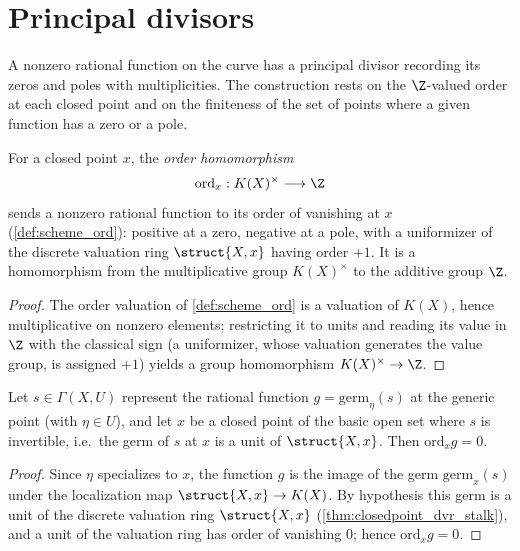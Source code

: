 \section{Principal divisors}

A nonzero rational function on the curve has a principal divisor recording its zeros and poles with
multiplicities. The construction rests on the \(\Z\)-valued order at each closed point and on the
finiteness of the set of points where a given function has a zero or a pole.

\begin{definition}
  \label{def:scheme_ordZ}
  \leanok
  For a closed point \(x\), the \emph{order homomorphism}
  \[
    \mathrm{ord}_x : K(X)^\times \longrightarrow \Z
  \]
  sends a nonzero rational function to its order of vanishing at \(x\) (\ref{def:scheme_ord}):
  positive at a zero, negative at a pole, with a uniformizer of the discrete valuation ring
  \(\struct{X,x}\) having order \(+1\). It is a homomorphism from the multiplicative group
  \(K(X)^\times\) to the additive group \(\Z\).
\end{definition}
\begin{proof}
  \leanok
  The order valuation of \ref{def:scheme_ord} is a valuation of \(K(X)\), hence multiplicative on
  nonzero elements; restricting it to units and reading its value in \(\Z\) with the classical sign
  (a uniformizer, whose valuation generates the value group, is assigned \(+1\)) yields a group
  homomorphism \(K(X)^\times \to \Z\).
\end{proof}

\begin{lemma}
  \label{lem:ord_eq_one_of_mem_basicOpen}
  \leanok
  Let \(s \in \Gamma(X, U)\) represent the rational function \(g = \mathrm{germ}_\eta(s)\) at the
  generic point (with \(\eta \in U\)), and let \(x\) be a closed point of the basic open set where
  \(s\) is invertible, i.e.\ the germ of \(s\) at \(x\) is a unit of \(\struct{X,x}\). Then
  \(\mathrm{ord}_x g = 0\).
\end{lemma}
\begin{proof}
  \leanok
  Since \(\eta\) specializes to \(x\), the function \(g\) is the image of the germ \(\mathrm{germ}_x(s)\)
  under the localization map \(\struct{X,x} \to K(X)\). By hypothesis this germ is a unit of the
  discrete valuation ring \(\struct{X,x}\) (\ref{thm:closedpoint_dvr_stalk}), and a unit of the
  valuation ring has order of vanishing \(0\); hence \(\mathrm{ord}_x g = 0\).
\end{proof}

